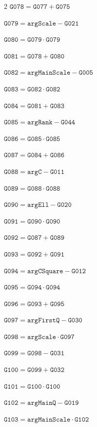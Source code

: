 \documentclass[10pt]{article}
\begin{document}
\begin{multicols}{2}
\noindent $\mathtt{G078}=\mathtt{G077}+\mathtt{G075}$\par
\noindent $\mathtt{G079}=\mathtt{argScale}-\mathtt{G021}$\par
\noindent $\mathtt{G080}=\mathtt{G079}\cdot \mathtt{G079}$\par
\noindent $\mathtt{G081}=\mathtt{G078}+\mathtt{G080}$\par
\noindent $\mathtt{G082}=\mathtt{argMainScale}-\mathtt{G005}$\par
\noindent $\mathtt{G083}=\mathtt{G082}\cdot \mathtt{G082}$\par
\noindent $\mathtt{G084}=\mathtt{G081}+\mathtt{G083}$\par
\noindent $\mathtt{G085}=\mathtt{argRank}-\mathtt{G044}$\par
\noindent $\mathtt{G086}=\mathtt{G085}\cdot \mathtt{G085}$\par
\noindent $\mathtt{G087}=\mathtt{G084}+\mathtt{G086}$\par
\noindent $\mathtt{G088}=\mathtt{argC}-\mathtt{G011}$\par
\noindent $\mathtt{G089}=\mathtt{G088}\cdot \mathtt{G088}$\par
\noindent $\mathtt{G090}=\mathtt{argEll}-\mathtt{G020}$\par
\noindent $\mathtt{G091}=\mathtt{G090}\cdot \mathtt{G090}$\par
\noindent $\mathtt{G092}=\mathtt{G087}+\mathtt{G089}$\par
\noindent $\mathtt{G093}=\mathtt{G092}+\mathtt{G091}$\par
\noindent $\mathtt{G094}=\mathtt{argCSquare}-\mathtt{G012}$\par
\noindent $\mathtt{G095}=\mathtt{G094}\cdot \mathtt{G094}$\par
\noindent $\mathtt{G096}=\mathtt{G093}+\mathtt{G095}$\par
\noindent $\mathtt{G097}=\mathtt{argFirstQ}-\mathtt{G030}$\par
\noindent $\mathtt{G098}=\mathtt{argScale}\cdot \mathtt{G097}$\par
\noindent $\mathtt{G099}=\mathtt{G098}-\mathtt{G031}$\par
\noindent $\mathtt{G100}=\mathtt{G099}+\mathtt{G032}$\par
\noindent $\mathtt{G101}=\mathtt{G100}\cdot \mathtt{G100}$\par
\noindent $\mathtt{G102}=\mathtt{argMainQ}-\mathtt{G019}$\par
\noindent $\mathtt{G103}=\mathtt{argMainScale}\cdot \mathtt{G102}$\par

\end{multicols}
\end{document}
